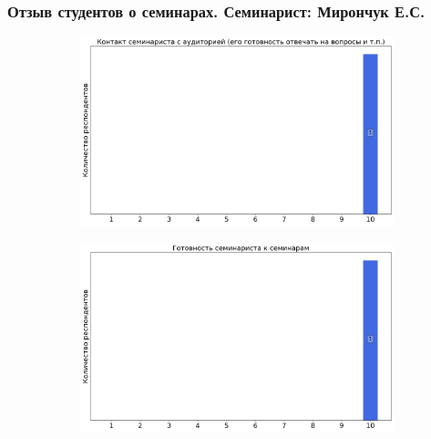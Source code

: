 	\subsubsection{Отзыв студентов о семинарах. Семинарист: Мирончук Е.С.}
		\begin{figure}[H]
			\centering
			\begin{subfigure}[b]{0.45\textwidth}
				\centering
				\includegraphics[width=\textwidth]{images/2 course/Общая физика - электричество и магнетизм/seminarists-marks-Мирончук Е.С.-0.png}
			\end{subfigure}
			\begin{subfigure}[b]{0.45\textwidth}
				\centering
				\includegraphics[width=\textwidth]{images/2 course/Общая физика - электричество и магнетизм/seminarists-marks-Мирончук Е.С.-1.png}
			\end{subfigure}
			\begin{subfigure}[b]{0.45\textwidth}
				\centering

\end{subfigure}
\end{figure}
